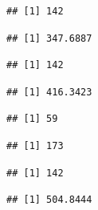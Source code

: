 \documentclass[]{article}
\begin{document}
\begin{verbatim}
## [1] 142
\end{verbatim}

\begin{verbatim}
## [1] 347.6887
\end{verbatim}

\begin{verbatim}
## [1] 142
\end{verbatim}

\begin{verbatim}
## [1] 416.3423
\end{verbatim}

\begin{verbatim}
## [1] 59
\end{verbatim}

\begin{verbatim}
## [1] 173
\end{verbatim}

\begin{verbatim}
## [1] 142
\end{verbatim}

\begin{verbatim}
## [1] 504.8444
\end{verbatim}
\end{document}
